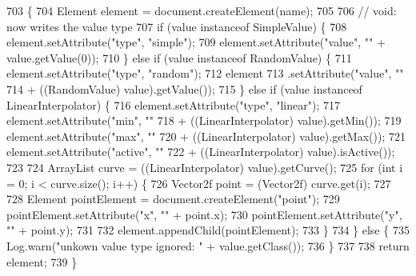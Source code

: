 \begin{DoxyCode}
703                                              \{
704         Element element = document.createElement(name);
705 
706         \textcolor{comment}{// void: now writes the value type}
707         \textcolor{keywordflow}{if} (value instanceof SimpleValue) \{
708             element.setAttribute(\textcolor{stringliteral}{"type"}, \textcolor{stringliteral}{"simple"});
709             element.setAttribute(\textcolor{stringliteral}{"value"}, \textcolor{stringliteral}{""} + value.getValue(0));
710         \} \textcolor{keywordflow}{else} \textcolor{keywordflow}{if} (value instanceof RandomValue) \{
711             element.setAttribute(\textcolor{stringliteral}{"type"}, \textcolor{stringliteral}{"random"});
712             element
713                     .setAttribute(\textcolor{stringliteral}{"value"}, \textcolor{stringliteral}{""}
714                             + ((RandomValue) value).getValue());
715         \} \textcolor{keywordflow}{else} \textcolor{keywordflow}{if} (value instanceof LinearInterpolator) \{
716             element.setAttribute(\textcolor{stringliteral}{"type"}, \textcolor{stringliteral}{"linear"});
717             element.setAttribute(\textcolor{stringliteral}{"min"}, \textcolor{stringliteral}{""}
718                     + ((LinearInterpolator) value).getMin());
719             element.setAttribute(\textcolor{stringliteral}{"max"}, \textcolor{stringliteral}{""}
720                     + ((LinearInterpolator) value).getMax());
721             element.setAttribute(\textcolor{stringliteral}{"active"}, \textcolor{stringliteral}{""}
722                     + ((LinearInterpolator) value).isActive());
723 
724             ArrayList curve = ((LinearInterpolator) value).getCurve();
725             \textcolor{keywordflow}{for} (\textcolor{keywordtype}{int} i = 0; i < curve.size(); i++) \{
726                 Vector2f point = (Vector2f) curve.get(i);
727 
728                 Element pointElement = document.createElement(\textcolor{stringliteral}{"point"});
729                 pointElement.setAttribute(\textcolor{stringliteral}{"x"}, \textcolor{stringliteral}{""} + point.x);
730                 pointElement.setAttribute(\textcolor{stringliteral}{"y"}, \textcolor{stringliteral}{""} + point.y);
731 
732                 element.appendChild(pointElement);
733             \}
734         \} \textcolor{keywordflow}{else} \{
735             Log.warn(\textcolor{stringliteral}{"unkown value type ignored: "} + value.getClass());
736         \}
737 
738         \textcolor{keywordflow}{return} element;
739     \}
\end{DoxyCode}
\mbox{\label{classorg_1_1newdawn_1_1slick_1_1particles_1_1_particle_i_o_a0f9a2d655a230395efcb645a520cf988}} 
